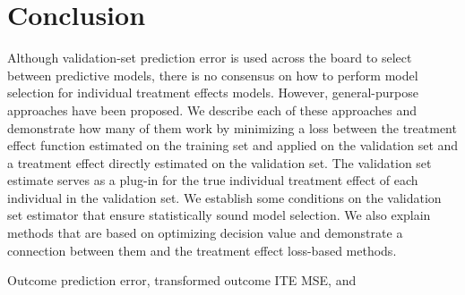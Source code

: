 \section{Conclusion}
\label{conclusion}

Although validation-set prediction error is used across the board to select between predictive models, there is no consensus on how to perform model selection for individual treatment effects models. However, general-purpose approaches have been proposed. We describe each of these approaches and demonstrate how many of them work by minimizing a loss between the treatment effect function estimated on the training set and applied on the validation set and a treatment effect directly estimated on the validation set. The validation set estimate serves as a plug-in for the true individual treatment effect of each individual in the validation set. We establish some conditions on the validation set estimator that ensure statistically sound model selection. We also explain methods that are based on optimizing decision value and demonstrate a connection between them and the treatment effect loss-based methods. 

Outcome prediction error, transformed outcome ITE MSE, and 